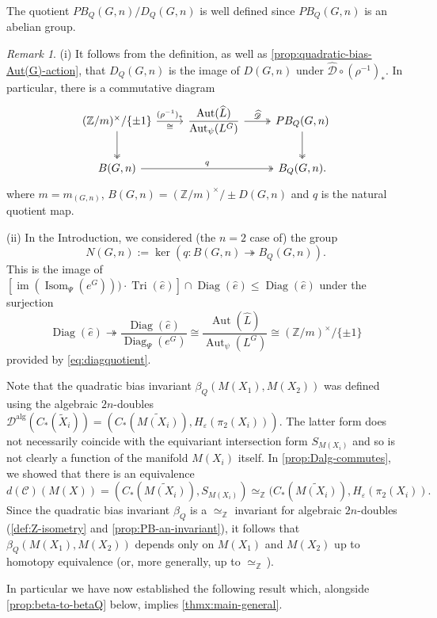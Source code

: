 \documentclass[11pt,a4paper,leqno]{amsart}
\theoremstyle{definition}
\theoremstyle{remark}
\newtheorem{remark}[theorem]{Remark}
\newcommand{\wh}{\widehat}
\newcommand{\wt}{\widetilde}
\newcommand{\Z}{\mathbb{Z}}
\DeclareMathOperator{\Aut}{Aut}
\DeclareMathOperator{\IM}{im}
\DeclareMathOperator{\Isom}{Isom}
\DeclareMathOperator{\DiagIsom}{Diag}
\DeclareMathOperator{\alg}{alg}
\DeclareMathOperator{\TriIsom}{Tri}
\renewcommand{\L}{L}
\newcommand{\dalg}{\mathscr{D}^{\alg}}
\newcommand{\ep}{\varepsilon}
\begin{document}
The quotient $PB_Q(G,n)/D_Q(G,n)$ is well defined since $PB_Q(G,n)$ is an abelian group.

\begin{remark} \label{remark:Aut(G)-is-easy}
(i)
It follows from the definition, as well as \cref{prop:quadratic-bias-Aut(G)-action}, that $D_Q(G,n)$ is the image of $D(G,n)$ under $\wh{\mathscr{D}} \circ (\rho^{-1})_*$. In particular, there is a commutative diagram
\[
\begin{tikzcd}
(\Z/m)^\times/\{\pm 1\} \ar[r,"(\rho^{-1})_*","\cong"'] \ar[d,twoheadrightarrow] & \displaystyle \frac{\Aut(\wh \L)}{\Aut_{\psi}(\L^G)} \ar[r,twoheadrightarrow,"\wh{\mathscr{D}}"] & PB_Q(G,n) \ar[d,twoheadrightarrow] \\
	\displaystyle B(G,n) \ar[rr,twoheadrightarrow,"q"] & & B_Q(G,n).
\end{tikzcd}
\]
where $m=m_{(G,n)}$, $B(G,n) = (\Z/m)^\times/\pm D(G,n)$ and $q$ is the natural quotient map.

(ii) In the Introduction, we considered (the $n=2$ case of) the group 
\[ N(G,n) := \ker(q \colon B(G,n) \twoheadrightarrow B_Q(G,n)).\]
This is the image of 
$[\IM(\Isom_\Psi(e^G))) \cdot \TriIsom(\wh e)] \cap \DiagIsom(\wh e) \le \DiagIsom(\wh e)$ under the surjection
 $$\DiagIsom(\wh e) \twoheadrightarrow \frac{\DiagIsom(\wh e)}{\DiagIsom_{\Psi}(e^G)} \cong \frac{\Aut(\wh \L)}{\Aut_{\psi}(\L^G)} \cong  (\Z/m)^\times/\{\pm 1\} $$ provided by \eqref{eq:diagquotient}.
\end{remark}

Note that the quadratic bias invariant $\beta_Q(M(X_1),M(X_2))$ was defined using the algebraic $2n$-doubles $\dalg(C_*(\wt X_i)) = (C_*(\wt{M(X_i)}), H_\ep( \pi_2(X_i)))$. The latter form does not necessarily coincide with the equivariant intersection form $S_{M(X_i)}$ and so is not clearly a function of the manifold $M(X_i)$ itself.
In \cref{prop:Dalg-commutes}, we showed that there is an equivalence
\[ d(\mathscr{C})(M(X)) = (C_*(\wt{M(X_i)}),S_{M(X_i)}) \simeq_{\Z} (C_*(\wt{M(X_i)}),H_\ep( \pi_2(X_i)). \]
Since the quadratic bias invariant $\beta_Q$ is a $\simeq_{\Z}$ invariant for algebraic $2n$-doubles (\cref{def:Z-isometry} and \cref{prop:PB-an-invariant}), it follows that $\beta_Q(M(X_1),M(X_2))$ depends only on $M(X_1)$ and $M(X_2)$ up to homotopy equivalence (or, more generally, up to $\simeq_{\Z}\,$).

In particular we have now established the following result which, alongside \cref{prop:beta-to-betaQ} below, implies \cref{thmx:main-general}.
\end{document}
